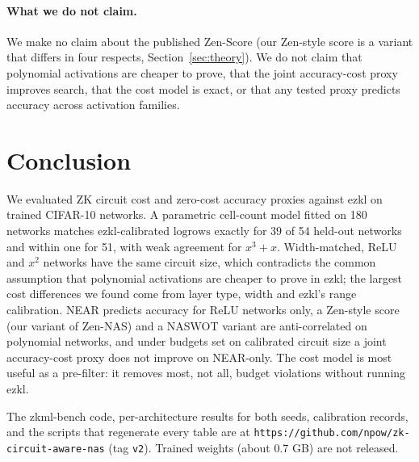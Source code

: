 \documentclass[10pt]{article}
\newcommand{\logrows}{\mathrm{logrows}}
\begin{document}
\paragraph{What we do not claim.}
We make no claim about the published Zen-Score (our Zen-style score is a variant that differs in four respects, Section~\ref{sec:theory}).  We do not claim that polynomial activations are cheaper to prove, that the joint accuracy-cost proxy improves search, that the cost model is exact, or that any tested proxy predicts accuracy across activation families.


\section{Conclusion}
\label{sec:conclusion}

We evaluated ZK circuit cost and zero-cost accuracy proxies against ezkl on trained CIFAR-10 networks.  A parametric cell-count model fitted on 180 networks matches ezkl-calibrated $\logrows$ exactly for 39 of 54
held-out networks and within one for 51, with weak agreement for $x^3{+}x$.  Width-matched, ReLU and $x^2$ networks have the same circuit size, which contradicts the common assumption that polynomial activations
are cheaper to prove in ezkl; the largest cost differences we found come from layer type, width and ezkl's range calibration.  NEAR predicts accuracy for ReLU networks only, a Zen-style score (our variant of Zen-NAS) and a NASWOT variant are anti-correlated on polynomial networks, and
under budgets set on calibrated circuit size a joint accuracy-cost proxy does not improve on NEAR-only.  The cost model is most useful as a pre-filter: it removes most, not all, budget violations without running ezkl.

The zkml-bench code, per-architecture results for both seeds, calibration records, and the scripts that regenerate every table are at
\texttt{https://github.com/npow/zk-circuit-aware-nas} (tag \texttt{v2}).  Trained weights (about 0.7 GB) are not released.
\end{document}
